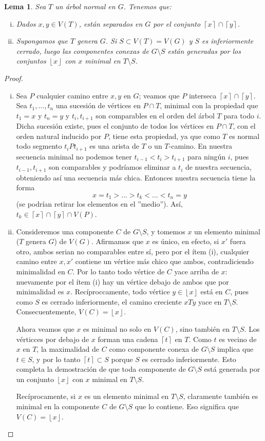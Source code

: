 \documentclass[12pt]{report}
\theoremstyle{plain}
\newtheorem{lemma}[theorem]{Lema}
\theoremstyle{definition}
\newcommand{\ceil}[1]{\left\lceil #1  \right\rceil}
\newcommand{\floor}[1]{\left\lfloor #1  \right\rfloor}
\begin{document}
\begin{lemma}
Sea $T$ un árbol normal en $G$. Tenemos que:
\begin{enumerate}[(i)]
\item Dados $x,y \in V(T)$, están separados en $G$ por el conjunto $\ceil x \cap \ceil y$.
\item Supongamos que $T$ genera $G$. Si $S \subset V(T) = V(G)$ y $S$ es inferiormente cerrado, luego las componentes conexas de $G \setminus S$ están generadas por los conjuntos $\floor x$ con $x$ minimal en $T \setminus S$.
\end{enumerate}
\end{lemma}
\begin{proof}
\begin{enumerate}[(i)]
\item Sea $P$ cualquier camino entre $x,y$ en $G$; veamos que $P$ interseca $\ceil x \cap \ceil y$. Sea $t_1,\ldots,t_n$ una sucesión de vértices en $P \cap T$, minimal con la propiedad que $t_1 = x$ y $t_n = y$ y $t_i,t_{i+1}$ son comparables en el orden del árbol $T$ para todo $i$. Dicha sucesión existe, pues el conjunto de todos los vértices en $P \cap T$, con el orden natural inducido por $P$, tiene esta propiedad, ya que como $T$ es normal todo segmento $t_i P t_{i+1}$ es una arista de $T$ o un $T$-camino. En nuestra secuencia minimal no podemos tener $t_{i-1}< t_i > t_{i+1}$ para ningún $i$, pues $t_{i-1},t_{i+1}$ son comparables y podríamos eliminar a $t_i$ de nuestra secuencia, obteniendo así una secuencia más chica. Entonces nuestra secuencia tiene la forma
\[
    x = t_1 > \ldots > t_k < \ldots < t_n = y
\]
(se podrían retirar los elementos en el ''medio''). Así, $t_k \in \ceil x \cap \ceil y \cap V(P)$.
\item Consideremos una componente $C$ de $G \setminus S$, y tomemos $x$ un elemento minimal ($T$ genera $G$) de $V(G)$. Afirmamos que $x$ es único, en efecto, si $x'$ fuera otro, ambos serian no comparables entre sí, pero por el ítem (i), cualquier camino entre $x,x'$ contiene un vértice más chico que ambos, contradiciendo minimalidad en $C$. Por lo tanto todo vértice de $C$ yace arriba de $x$: nuevamente por el ítem (i) hay un vértice debajo de ambos que por minimalidad es $x$. Recíproccamente, todo vértice $y \in \floor x$ está en $C$, pues como $S$ es cerrado inferiormente, el camino creciente $x T y$ yace en $T\setminus S$. Consecuentemente, $V(C)= \floor x$.

Ahora veamos que $x$ es minimal no solo en $V(C)$, sino también en $T \setminus S$. Los vérticces por debajo de $x$ forman una cadena $\ceil t$ en $T$. Como $t$ es vecino de $x$ en $T$, la maximalidad de $C$ como componente conexa de $G \setminus S$ implica que $t \in S$, y por lo tanto $\ceil t \subset S$ porque $S$ es cerrado inferiormente. Esto completa la demostración de que toda componente de $G\setminus S$ está generada por un conjunto $\floor x$ con $x$ minimal en $T \setminus S$.

Recíprocamente, si $x$ es un elemento minimal en $T \setminus S$, claramente también es minimal en la componente $C$ de $G \setminus S$ que lo contiene. Eso significa que $V(C) = \floor x$.
\end{enumerate}
\end{proof}
\end{document}
